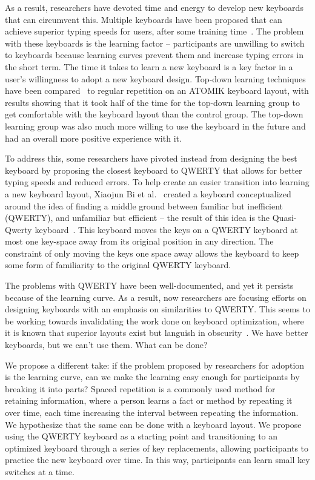 As a result, researchers have devoted time and energy to develop new keyboards that can circumvent this. Multiple keyboards have been proposed that can achieve superior typing speeds for users, after some training time~\cite{ Dunlop:2012:MPO:2207676.2208659, lee2004top, Bi:2010:QSK:1753326.1753367, Bi:2016:IDO:2858036.285842}. The problem with these keyboards is the learning factor -- participants are unwilling to switch to keyboards because learning curves prevent them and increase typing errors in the short term.   The time it takes to learn a new keyboard is a key factor in a user's willingness to adopt a new keyboard design. Top-down learning techniques have been compared~\cite{lee2004top} to regular repetition on an ATOMIK keyboard layout, with results showing that it took half of the time for the top-down learning group to get comfortable with the keyboard layout than the control group.  The top-down learning group was also much more willing to use the keyboard in the future and had an overall more positive experience with it.  

To address this, some researchers have pivoted instead from designing the best keyboard by proposing the closest keyboard to QWERTY that allows for better typing speeds and reduced errors. To help create an easier transition into learning a new keyboard layout, Xiaojun Bi et al.~\cite{Bi:2010:QSK:1753326.1753367} created a keyboard conceptualized around the idea of finding a middle ground between familiar but inefficient (QWERTY), and unfamiliar but efficient --  the result of this idea is the Quasi-Qwerty keyboard~\cite{Bi:2010:QSK:1753326.1753367}.  This keyboard moves the keys on a QWERTY keyboard at most one key-space away from its original position in any direction.  The constraint of only moving the keys one space away allows the keyboard to keep some form of familiarity to the original QWERTY keyboard.

The problems with QWERTY have been well-documented, and yet it persists because of the learning curve. As a result, now researchers are focusing efforts on designing keyboards with an emphasis on similarities to QWERTY. This seems to be working towards invalidating the work done on keyboard optimization, where it is known that superior layouts exist but languish in obscurity~\cite{ Dunlop:2012:MPO:2207676.2208659}. We have better keyboards, but we can't use them. What can be done?

We propose a different take: if the problem proposed by researchers for adoption is the learning curve, can we make the learning easy enough for participants by breaking it into parts? Spaced repetition is a commonly used method for retaining information, where a person learns a fact or method by repeating it over time, each time increasing the interval between repeating the information. We hypothesize that the same can be done with a keyboard layout. We propose using the QWERTY keyboard as a starting point and transitioning to an optimized keyboard through a series of key replacements, allowing participants to practice the new keyboard over time. In this way, participants can learn small key switches at a time.

